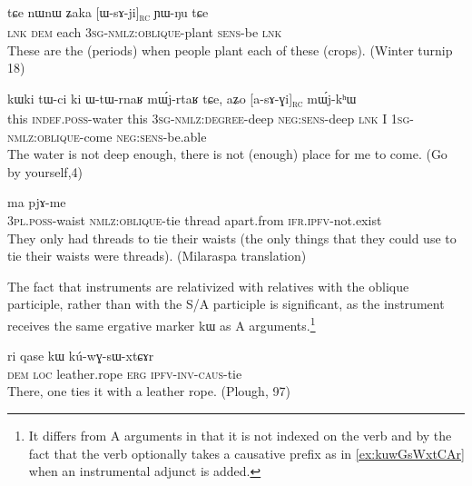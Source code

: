 \documentclass[oldfontcommands,oneside,a4paper,11pt]{article}
\newcommand{\ipa}[1]{{\phon #1}} %
\newcommand{\rc}{\textsubscript{\textsc{rc}}}
\begin{document}
\begin{exe}
   \ex \label{ex:WsAji}
   \gll
   \ipa{tɕe} 	\ipa{nɯnɯ} 	\ipa{ʑaka} 	[\ipa{ɯ-sɤ-ji}]\rc{} 	\ipa{ɲɯ-ŋu} 	\ipa{tɕe}\\
   \textsc{lnk} \textsc{dem} each \textsc{3sg-nmlz:oblique}-plant \textsc{sens}-be \textsc{lnk}\\
\glt These are the (periods) when people plant each of these (crops). (Winter turnip 18)
\end{exe}

\begin{exe}
   \ex \label{ex:asAGi}
 \gll
\ipa{kɯki}   	\ipa{tɯ-ci}   	\ipa{ki}   	\ipa{ɯ-tɯ-rnaʁ}   	\ipa{mɯ́j-rtaʁ}   	\ipa{tɕe,}   	\ipa{aʑo}   	[\ipa{a-sɤ-ɣi}]\rc{}   	\ipa{mɯ́j-kʰɯ}   \\
this \textsc{indef.poss}-water this \textsc{3sg-nmlz:degree}-deep \textsc{neg:sens}-deep \textsc{lnk} I \textsc{1sg-nmlz:oblique}-come \textsc{neg:sens}-be.able \\
\glt The water is not deep enough, there is not (enough) place for me to come. (Go by yourself,4)
\end{exe}


 \begin{exe}
  \ex  \label{ex:sAxtCAr}  
  \gll [\ipa{nɯ-mtʰɤɣ}  	\ipa{sɤ-xtɕɤr}]  	\ipa{xɕɤfsa}  	\ipa{ma}  	\ipa{pjɤ-me}  \\
\textsc{3pl.poss}-waist \textsc{nmlz:oblique}-tie thread apart.from \textsc{ifr.ipfv}-not.exist \\
\glt They only had threads to tie their waists (the only things that they could use to tie their waists were threads). (Milaraspa translation)
   \end{exe} 

The fact that instruments are relativized with relatives with the oblique participle, rather than with the S/A participle is significant, as the instrument receives the same ergative marker \ipa{kɯ} as A arguments.\footnote{It differs from A arguments in that it is not indexed on the verb and by the fact that the verb optionally takes a causative prefix as in \ref{ex:kuwGsWxtCAr}  when an instrumental adjunct is added.}

 \begin{exe}
  \ex   \label{ex:kuwGsWxtCAr}  
\gll \ipa{ɯnɯnɯ}  	\ipa{ri}  	\ipa{qase}  	\ipa{kɯ}  	\ipa{kú-wɣ-sɯ-xtɕɤr}  \\
\textsc{dem} \textsc{loc} leather.rope \textsc{erg} \textsc{ipfv-inv-caus}-tie \\
\glt There, one ties it with a leather rope. (Plough, 97)
   \end{exe} 
   
\end{document}
